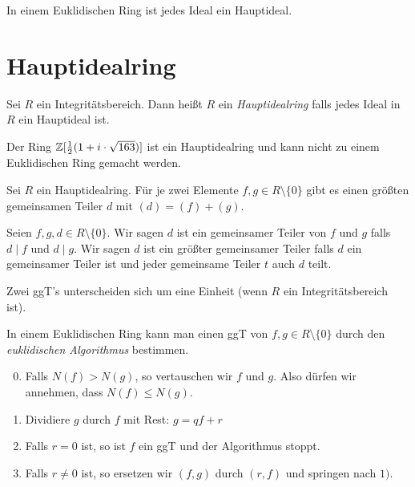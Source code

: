\begin{theorem}
	In einem Euklidischen Ring ist jedes Ideal ein Hauptideal.
\end{theorem}


\section{Hauptidealring}
\begin{definition}
	Sei $R$ ein Integritätsbereich. Dann heißt $R$ ein \emph{Hauptidealring} falls jedes Ideal in $R$ ein Hauptideal ist.
\end{definition}


\begin{remark}
	Der Ring $\mathbb{Z}[\frac{1}{2}(1+i\cdot \sqrt{163})]$ ist ein Hauptidealring und kann nicht zu einem Euklidischen Ring gemacht werden.
\end{remark}

\begin{proposition}
	Sei $R$ ein Hauptidealring. Für je zwei Elemente $f,g \in R \setminus \{0\} $ gibt es einen größten gemeinsamen Teiler $d$ mit $(d) = (f) + (g)$.
\end{proposition}

\begin{definition}
	Seien $f,g,d \in R \setminus \{0\} $. Wir sagen $d $ ist ein gemeinsamer Teiler von $f$ und $g$ falls $d \mid f$ und $d \mid g$.
	Wir sagen $d$ ist ein größter gemeinsamer Teiler falls $d$ ein gemeinsamer Teiler ist und jeder gemeinsame Teiler $t$ auch $d$ teilt.
\end{definition}

\begin{remark}
	Zwei ggT's unterscheiden sich um eine Einheit (wenn $R$ ein Integritätsbereich ist).
\end{remark}


In einem Euklidischen Ring kann man einen ggT von $f,g \in R \setminus \{0\} $ durch den \emph{euklidischen Algorithmus} bestimmen.
\begin{enumerate}[1)]
	\setcounter{enumi}{-1}
	\item Falls $N(f) > N(g)$, so vertauschen wir $f$ und $g$. 
		Also dürfen wir annehmen, dass $N(f) \leq N(g)$.
	\item Dividiere $g$ durch $f$ mit Rest: $g = q f + r$
	\item Falls $r = 0$ ist, so ist $f$ ein ggT und der Algorithmus stoppt.
	\item Falls $r\neq 0$ ist, so ersetzen wir $(f,g)$ durch $(r,f)$ und springen nach $1)$.
\end{enumerate}

